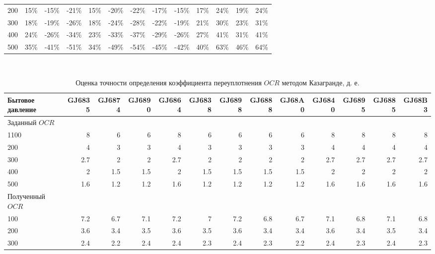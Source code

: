 \begin{sidewaystable}[p]
\begin{tabular}{@{}lrrrrrrrrrrrr@{}}
    200 & 15\% & -15\% & -21\% & 15\% & -20\% & -22\% & -17\% & -15\% & 17\% & 24\% & 19\% & 24\% \\
    300 & 18\% & -19\% & -26\% & 18\% & -24\% & -28\% & -22\% & -19\% & 21\% & 30\% & 23\% & 31\% \\
    400 & 24\% & -26\% & -34\% & 23\% & -33\% & -37\% & -29\% & -26\% & 27\% & 41\% & 31\% & 41\% \\
    500 & 35\% & -41\% & -51\% & 34\% & -49\% & -54\% & -45\% & -42\% & 40\% & 63\% & 46\% & 64\% \\
    \bottomrule
    \end{tabular}
    \\ 
\end{sidewaystable}


\begin{sidewaystable}[p]
    \centering
    \small
    \caption{Оценка точности определения коэффициента переуплотнения $OCR$ методом Казагранде, д. е.} \label{tab:ocr-caz}
    \begin{tabular}{@{}lrrrrrrrrrrrr@{}}
    \toprule
    Бытовое давление & GJ6835 & GJ6874 & GJ6890 & GJ6864 & GJ6838 & GJ6898 & GJ6888 & GJ68A0 & GJ6840 & GJ6895 & GJ6885 & GJ68B3 \\
    \midrule
    Заданный $OCR$ &  &  &  &  &  &  &  &  &  &  &  &  \\
    1100 & 8 & 6 & 6 & 8 & 6 & 6 & 6 & 6 & 8 & 8 & 8 & 8 \\
    200 & 4 & 3 & 3 & 4 & 3 & 3 & 3 & 3 & 4 & 4 & 4 & 4 \\
    300 & 2.7 & 2 & 2 & 2.7 & 2 & 2 & 2 & 2 & 2.7 & 2.7 & 2.7 & 2.7 \\
    400 & 2 & 1.5 & 1.5 & 2 & 1.5 & 1.5 & 1.5 & 1.5 & 2 & 2 & 2 & 2 \\
    500 & 1.6 & 1.2 & 1.2 & 1.6 & 1.2 & 1.2 & 1.2 & 1.2 & 1.6 & 1.6 & 1.6 & 1.6 \\
    Полученный $OCR$ &  &  &  &  &  &  &  &  &  &  &  &  \\
    100 & 7.2 & 6.7 & 7.1 & 7.2 & 7 & 7.2 & 6.8 & 6.7 & 7.1 & 6.8 & 7.1 & 6.8 \\
    200 & 3.6 & 3.4 & 3.5 & 3.6 & 3.5 & 3.6 & 3.4 & 3.4 & 3.6 & 3.4 & 3.5 & 3.4 \\
    300 & 2.4 & 2.2 & 2.4 & 2.4 & 2.3 & 2.4 & 2.3 & 2.2 & 2.4 & 2.3 & 2.4 & 2.3 \\

\end{tabular}
\end{sidewaystable}
